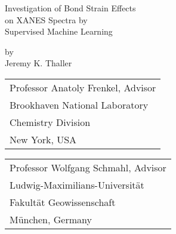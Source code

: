 \documentclass[12pt, oneside]{book}
\begin{document}
\begin{titlepage}
\begin{center}

\vspace*{2cm}

{\huge Investigation of Bond Strain Effects\\on XANES Spectra by \\Supervised Machine Learning} %

\vspace{2cm}

{\large by\\Jeremy K. Thaller}

\vspace{2cm}


\noindent\begin{tabular}[t]{@{}l}
	Professor Anatoly Frenkel, Advisor\\
	Brookhaven National Laboratory\\
	Chemistry Division \\
	New York, USA
\end{tabular}
\hfill
\begin{tabular}[t]{l@{}}
	Professor Wolfgang Schmahl, Advisor \\
	Ludwig-Maximilians-Universität\\
	Fakultät Geowissenschaft \\
	München, Germany
\end{tabular}


\end{center}
\end{titlepage}
\end{document}
